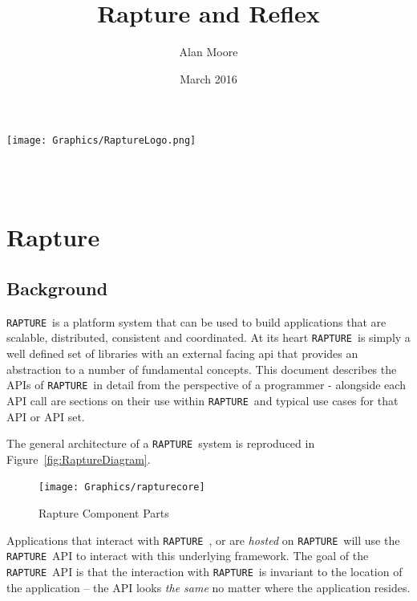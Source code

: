 \documentclass[12pt,twoside,a4paper]{book}
\newcommand{\Rapture}{\Verb+RAPTURE+~}
\begin{document}
\title{Rapture and Reflex}
\author{Alan Moore}
\date{March 2016}

\makeatletter
    \begin{titlepage}
      \texttt{[image: Graphics/RaptureLogo.png]}\\[4ex]
        \begin{center}
            {\huge \bfseries  \@title }\\[2ex]
            {\LARGE  \@author}\\[50ex]
            {\large \@date}
        \end{center}
    \end{titlepage}
\makeatother
\thispagestyle{empty}
\newpage


\tableofcontents
\setcounter{page}{1} %


\part{Rapture}
\chapter{Background}
\Rapture is a platform system that can be used to build applications that are scalable,
distributed, consistent and coordinated. At its heart \Rapture is simply a well defined
set of libraries with an external facing api that provides an abstraction to a number
of fundamental concepts. This document describes the APIs of \Rapture in detail from the
perspective of a programmer - alongside each API call are sections on their use within
\Rapture and typical use cases for that API or API set.

The general architecture of a \Rapture system is reproduced in Figure~\vref{fig:RaptureDiagram}.

\begin{figure}[htb]
\centering
\texttt{[image: Graphics/rapturecore]}
\caption{Rapture Component Parts}
\label{fig:RaptureDiagram}
\end{figure}

Applications that interact with \Rapture, or are \emph{hosted} on \Rapture will
use the \Rapture API to interact with this underlying framework. The goal of
the \Rapture API is that the interaction with \Rapture is invariant to the location
of the application -- the API looks \emph{the same} no matter where the application
resides.
\end{document}
